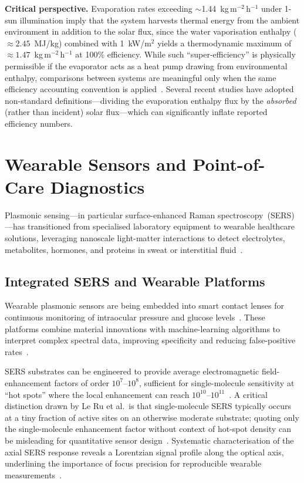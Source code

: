 \documentclass[twocolumn,10pt]{article}
\begin{document}
\noindent\textbf{Critical perspective.}  Evaporation rates exceeding
$\sim$1.44~kg\,m$^{-2}$\,h$^{-1}$ under 1-sun illumination imply that
the system harvests thermal energy from the ambient environment in
addition to the solar flux, since the water vaporisation enthalpy
($\approx 2.45$~MJ/kg) combined with 1~kW/m$^2$ yields a
thermodynamic maximum of $\approx 1.47$~kg\,m$^{-2}$\,h$^{-1}$ at
100\% efficiency.  While such ``super-efficiency'' is physically
permissible if the evaporator acts as a heat pump drawing from
environmental enthalpy, comparisons between systems are meaningful
only when the same efficiency accounting convention is
applied~\cite{zhou2016solar}.  Several recent studies have adopted
non-standard definitions---dividing the evaporation enthalpy flux by
the \textit{absorbed} (rather than incident) solar flux---which can
significantly inflate reported efficiency numbers.

\section{Wearable Sensors and Point-of-Care Diagnostics}
\label{sec:sensors}

Plasmonic sensing---in particular surface-enhanced Raman
spectroscopy~(SERS)---has transitioned from specialised laboratory
equipment to wearable healthcare solutions, leveraging nanoscale
light-matter interactions to detect electrolytes, metabolites, hormones,
and proteins in sweat or interstitial
fluid~\cite{maier2007plasmonics,leru2007surface}.

\subsection{Integrated SERS and Wearable Platforms}

Wearable plasmonic sensors are being embedded into smart contact lenses
for continuous monitoring of intraocular pressure and glucose
levels~\cite{kim2019wearable}.  These platforms combine material
innovations with machine-learning algorithms to interpret complex
spectral data, improving specificity and reducing false-positive
rates~\cite{kim2019wearable}.

SERS substrates can be engineered to provide average electromagnetic
field-enhancement factors of order $10^{7}$--$10^{8}$, sufficient for
single-molecule sensitivity at ``hot spots'' where the local
enhancement can reach $10^{10}$--$10^{11}$~\cite{leru2007surface}.  A
critical distinction drawn by Le Ru et al.\ is that single-molecule
SERS typically occurs at a tiny fraction of active sites on an
otherwise moderate substrate; quoting only the single-molecule
enhancement factor without context of hot-spot density can be
misleading for quantitative sensor design~\cite{leru2007surface}.
Systematic characterisation of the
axial SERS response reveals a Lorentzian signal profile along the
optical axis, underlining the importance of focus precision for
reproducible wearable measurements~\cite{ding2016nanostructure}.
\end{document}
